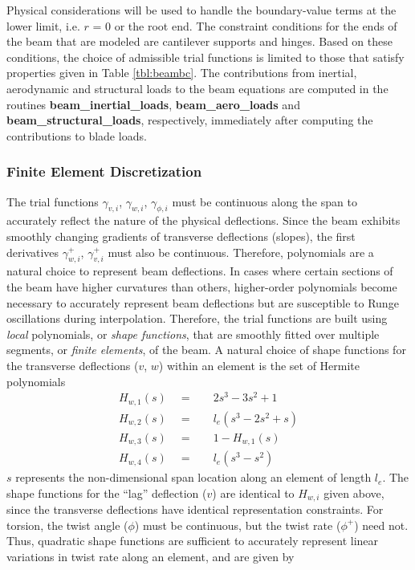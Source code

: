 Physical considerations will be used to handle the boundary-value terms at the lower limit, i.e. $r$ = 0 or the root end. The constraint conditions for the ends of the beam that are modeled are cantilever supports and hinges. Based on these conditions, the choice of admissible trial functions is limited to those that satisfy properties given in Table \ref{tbl:beambc}. The contributions from inertial, aerodynamic and structural loads to the beam equations are computed in the routines \textbf{beam\_inertial\_loads}, \textbf{beam\_aero\_loads} and \textbf{beam\_structural\_loads}, respectively, immediately after computing the contributions to blade loads. 

\subsubsection{Finite Element Discretization}
\label{sec:FEM}
The trial functions $\gamma_{v,i}$, $\gamma_{w,i}$, $\gamma_{\phi,i}$ must be continuous along the span to accurately reflect the nature of the physical deflections. Since the beam exhibits smoothly changing gradients of transverse deflections (slopes), the first derivatives $\gamma_{w,i}^+$, $\gamma_{v,i}^+$ must also be continuous. Therefore, polynomials are a natural choice to represent beam deflections. In cases where certain sections of the beam have higher curvatures than others, higher-order polynomials become necessary to accurately represent beam deflections but are susceptible to Runge oscillations during interpolation. Therefore, the trial functions are built using \emph{local} polynomials, or \emph{shape functions}, that are smoothly fitted over multiple segments, or \emph{finite elements}, of the beam. A natural choice of shape functions for the transverse deflections ($v$, $w$) within an element is the set of Hermite polynomials 
\begin{align*}
H_{w,1}(s) \quad = \quad & 2 s^3 - 3 s^2 + 1\\
H_{w,2}(s) \quad = \quad & l_e (s^3 - 2 s^2 + s) \\
H_{w,3}(s) \quad = \quad & 1 - H_{w,1}(s) \\
H_{w,4}(s) \quad = \quad & l_e (s^3 - s^2)
\end{align*}
$s$ represents the non-dimensional span location along an element of length $l_e$. The shape functions for the ``lag'' deflection ($v$) are identical to $H_{w,i}$ given above, since the transverse deflections have identical representation constraints. For torsion, the twist angle ($\phi$) must be continuous, but the twist rate ($\phi^+$) need not. Thus, quadratic shape functions are sufficient to accurately represent linear variations in twist rate along an element, and are given by 
